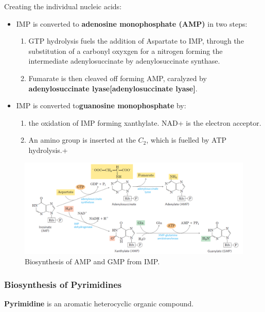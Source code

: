 \documentclass[../main.tex]{subfiles}
\begin{document}
Creating the individual nucleic acids:

\begin{itemize}
	\item IMP is converted to \textbf{\gls{adenosine monophosphate (AMP)}} in two steps:
	\begin{enumerate}
		\item GTP hydrolysis fuels the addition of Aspartate to IMP, through the substitution of a carbonyl oxyxgen for a nitrogen forming the intermediate adenylosuccinate by adenylosuccinate synthase.
		\item Fumarate is then cleaved off forming AMP, caralyzed by \textbf{\gls{adenylosuccinate lyase}[adenylosuccinate lyase]}.
	\end{enumerate}
	\item IMP is converted to\textbf{\gls{guanosine monophosphate}} by:
	\begin{enumerate}
		\item the oxidation of IMP forming xanthylate. NAD+ is the electron acceptor.
		\item An amino group is inserted at the $C_{2}$, which is fuelled by ATP hydrolysis.+
	\end{enumerate}
\end{itemize}

\begin{figure}[H]
	\centering
	\includegraphics[width=0.8\linewidth]{puri_path2}
	\caption{Biosynthesis of AMP and GMP from IMP.}
	\label{fig:puripath2}
\end{figure}


\subsubsection{Biosynthesis of Pyrimidines}

\textbf{\gls{Pyrimidine}} is an aromatic heterocyclic organic compound.
\end{document}
